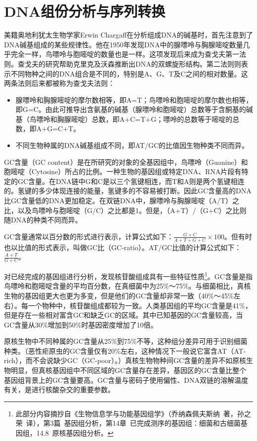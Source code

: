 \documentclass[11pt,a4paper,twoside]{book}
\begin{document}
\section{DNA组份分析与序列转换}
美籍奥地利犹太生物学家Erwin Chargaff在分析组成DNA的碱基时，首先注意到了DNA碱基组成的某些规律性。他在1950年发现DNA中的腺嘌呤与胸腺嘧啶数量几乎完全一样，鸟嘌呤与胞嘧啶的数量也是一样。这项发现后来成为查戈夫第一法则。查戈夫的研究帮助克里克及沃森推断出DNA的双螺旋形结构。第二法则则表示不同物种之间的DNA组合是不同的，特别是A、G、T及C之间的相对数量。这两条法则后来都被称为查戈夫法则：
\begin{itemize}
  \item 腺嘌呤和胸腺嘧啶的摩尔数相等，即A=T；鸟嘌呤和胞嘧啶的摩尔数也相等，即G=C。由此可推导出含氨基的碱基（腺嘌呤和胞嘧啶）总数等于含酮基的碱基（鸟嘌呤和胸腺嘧啶）总数，即A+C=T+G；嘌呤的总数等于嘧啶的总数，即A+G=C+T。
  \item 不同生物种属的DNA碱基组成不同，即AT/GC的比值因生物种类不同而异。
\end{itemize}

GC含量（GC content）是在所研究的对象的全基因组中，鸟嘌呤（Guanine）和胞嘧啶（Cytosine）所占的比例。一种生物的基因组或特定DNA、RNA片段有特定的GC含量。在DNA链中G和C是以三个氢键相连，而T和A则是两个氢键相连的。氢键的多少体现连接的能量，氢键多的不容易被打断。因此GC含量高的DNA比GC含量低的DNA更加稳定。在双链DNA中，腺嘌呤与胸腺嘧啶（A/T）之比，以及鸟嘌呤与胞嘧啶（G/C）之比都是1。但是，（A+T）/（G+C）之比则随DNA的种类不同而异。

GC含量通常以百分数的形式进行表示，计算公式如下：$\frac{G+C}{A+T+G+C}\times100$。但有时也以比值的形式表示，叫做GC比（GC-ratio）。AT/GC比值的计算公式如下：$\frac{A+T}{G+C}$。

对已经完成的基因组进行分析，发现核苷酸组成具有一些特征性质\footnote{此部分内容摘抄自《生物信息学与功能基因组学》（乔纳森\textbullet 佩夫斯纳\ 著，孙之荣\ 译），第3篇\ 基因组分析，第14章\ 已完成测序的基因组：细菌和古细菌基因组，14.8\ 原核基因组分析。}。GC含量是指鸟嘌呤和胞嘧啶含量的平均百分数，在真细菌中为25\%～75\%。与细菌相比，真核生物的基因组更大也更为多变，但是他们的GC含量却非常一致（40\%～45\%左右）。每一个物种中，核苷酸组成都较为一致。人类基因组的平均GC含量是41\%，但是存在一些相对富含GC和缺乏GC的区域。其中已知基因的GC含量较高，当GC含量从30\%增加到50\%时基因密度增加了10倍。

原核生物中不同种属的GC含量从25\%到75\%不等，这种组分差异可用于识别细菌种类。（恶性疟原虫的GC含量仅有20\%左右，这种情况下一般说它富含AT（AT-rich），而不会说缺少GC（GC-poor）。）真核生物物种间GC含量的差异不如原核生物明显，但真核基因组中不同区域的GC含量存在差异，基因区的GC含量比整个基因组背景上的GC含量要高。GC含量与密码子使用偏性、DNA双链的溶解温度有关，是进行核酸杂交的重要参数。
\end{document}
